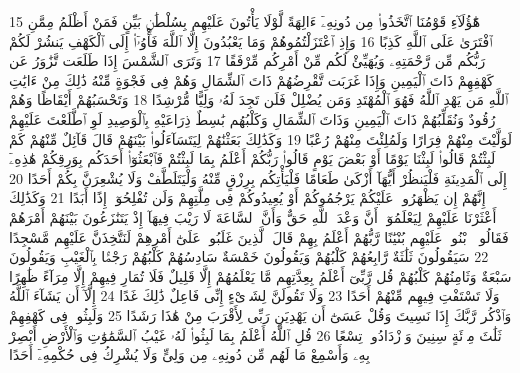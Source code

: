 {\tiny\colorbox{cl_aya}{15}} هَٰٓؤُلَآءِ قَوْمُنَا ٱتَّخَذُوا۟ مِن دُونِهِۦٓ ءَالِهَةً لَّوْلَا يَأْتُونَ عَلَيْهِم بِسُلْطَٰنٍۭ بَيِّنٍ فَمَنْ أَظْلَمُ مِمَّنِ ٱفْتَرَىٰ عَلَى ٱللَّهِ كَذِبًا
{\tiny\colorbox{cl_aya}{16}} وَإِذِ ٱعْتَزَلْتُمُوهُمْ وَمَا يَعْبُدُونَ إِلَّا ٱللَّهَ فَأْوُۥٓا۟ إِلَى ٱلْكَهْفِ يَنشُرْ لَكُمْ رَبُّكُم مِّن رَّحْمَتِهِۦ وَيُهَيِّئْ لَكُم مِّنْ أَمْرِكُم مِّرْفَقًا
{\tiny\colorbox{cl_aya}{17}} وَتَرَى ٱلشَّمْسَ إِذَا طَلَعَت تَّزَٰوَرُ عَن كَهْفِهِمْ ذَاتَ ٱلْيَمِينِ وَإِذَا غَرَبَت تَّقْرِضُهُمْ ذَاتَ ٱلشِّمَالِ وَهُمْ فِى فَجْوَةٍ مِّنْهُ ذَٰلِكَ مِنْ ءَايَٰتِ ٱللَّهِ مَن يَهْدِ ٱللَّهُ فَهُوَ ٱلْمُهْتَدِ وَمَن يُضْلِلْ فَلَن تَجِدَ لَهُۥ وَلِيًّا مُّرْشِدًا
{\tiny\colorbox{cl_aya}{18}} وَتَحْسَبُهُمْ أَيْقَاظًا وَهُمْ رُقُودٌ وَنُقَلِّبُهُمْ ذَاتَ ٱلْيَمِينِ وَذَاتَ ٱلشِّمَالِ وَكَلْبُهُم بَٰسِطٌ ذِرَاعَيْهِ بِٱلْوَصِيدِ لَوِ ٱطَّلَعْتَ عَلَيْهِمْ لَوَلَّيْتَ مِنْهُمْ فِرَارًا وَلَمُلِئْتَ مِنْهُمْ رُعْبًا
{\tiny\colorbox{cl_aya}{19}} وَكَذَٰلِكَ بَعَثْنَٰهُمْ لِيَتَسَآءَلُوا۟ بَيْنَهُمْ قَالَ قَآئِلٌ مِّنْهُمْ كَمْ لَبِثْتُمْ قَالُوا۟ لَبِثْنَا يَوْمًا أَوْ بَعْضَ يَوْمٍ قَالُوا۟ رَبُّكُمْ أَعْلَمُ بِمَا لَبِثْتُمْ فَٱبْعَثُوٓا۟ أَحَدَكُم بِوَرِقِكُمْ هَٰذِهِۦٓ إِلَى ٱلْمَدِينَةِ فَلْيَنظُرْ أَيُّهَآ أَزْكَىٰ طَعَامًا فَلْيَأْتِكُم بِرِزْقٍ مِّنْهُ وَلْيَتَلَطَّفْ وَلَا يُشْعِرَنَّ بِكُمْ أَحَدًا
{\tiny\colorbox{cl_aya}{20}} إِنَّهُمْ إِن يَظْهَرُوا۟ عَلَيْكُمْ يَرْجُمُوكُمْ أَوْ يُعِيدُوكُمْ فِى مِلَّتِهِمْ وَلَن تُفْلِحُوٓا۟ إِذًا أَبَدًا
{\tiny\colorbox{cl_aya}{21}} وَكَذَٰلِكَ أَعْثَرْنَا عَلَيْهِمْ لِيَعْلَمُوٓا۟ أَنَّ وَعْدَ ٱللَّهِ حَقٌّ وَأَنَّ ٱلسَّاعَةَ لَا رَيْبَ فِيهَآ إِذْ يَتَنَٰزَعُونَ بَيْنَهُمْ أَمْرَهُمْ فَقَالُوا۟ ٱبْنُوا۟ عَلَيْهِم بُنْيَٰنًا رَّبُّهُمْ أَعْلَمُ بِهِمْ قَالَ ٱلَّذِينَ غَلَبُوا۟ عَلَىٰٓ أَمْرِهِمْ لَنَتَّخِذَنَّ عَلَيْهِم مَّسْجِدًا
{\tiny\colorbox{cl_aya}{22}} سَيَقُولُونَ ثَلَٰثَةٌ رَّابِعُهُمْ كَلْبُهُمْ وَيَقُولُونَ خَمْسَةٌ سَادِسُهُمْ كَلْبُهُمْ رَجْمًۢا بِٱلْغَيْبِ وَيَقُولُونَ سَبْعَةٌ وَثَامِنُهُمْ كَلْبُهُمْ قُل رَّبِّىٓ أَعْلَمُ بِعِدَّتِهِم مَّا يَعْلَمُهُمْ إِلَّا قَلِيلٌ فَلَا تُمَارِ فِيهِمْ إِلَّا مِرَآءً ظَٰهِرًا وَلَا تَسْتَفْتِ فِيهِم مِّنْهُمْ أَحَدًا
{\tiny\colorbox{cl_aya}{23}} وَلَا تَقُولَنَّ لِشَا۟ىْءٍ إِنِّى فَاعِلٌ ذَٰلِكَ غَدًا
{\tiny\colorbox{cl_aya}{24}} إِلَّآ أَن يَشَآءَ ٱللَّهُ وَٱذْكُر رَّبَّكَ إِذَا نَسِيتَ وَقُلْ عَسَىٰٓ أَن يَهْدِيَنِ رَبِّى لِأَقْرَبَ مِنْ هَٰذَا رَشَدًا
{\tiny\colorbox{cl_aya}{25}} وَلَبِثُوا۟ فِى كَهْفِهِمْ ثَلَٰثَ مِا۟ئَةٍ سِنِينَ وَٱزْدَادُوا۟ تِسْعًا
{\tiny\colorbox{cl_aya}{26}} قُلِ ٱللَّهُ أَعْلَمُ بِمَا لَبِثُوا۟ لَهُۥ غَيْبُ ٱلسَّمَٰوَٰتِ وَٱلْأَرْضِ أَبْصِرْ بِهِۦ وَأَسْمِعْ مَا لَهُم مِّن دُونِهِۦ مِن وَلِىٍّ وَلَا يُشْرِكُ فِى حُكْمِهِۦٓ أَحَدًا
